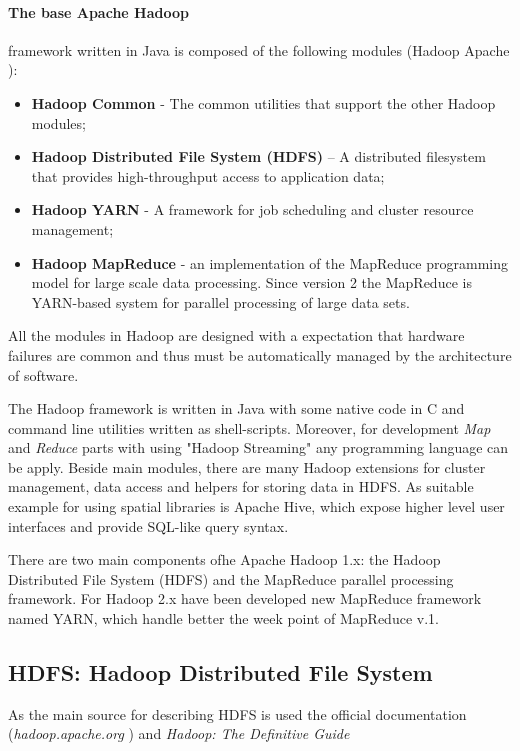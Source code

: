 \documentclass[a4paper,12pt,oneside]{report}
\begin{document}
	\paragraph*{The base Apache Hadoop}framework written in Java is composed of the
	following modules (Hadoop Apache \cite{hadoop_web}):
	\begin{itemize}
		\item \textbf{Hadoop Common} - The common utilities that support the other
		Hadoop modules;
		\item \textbf{Hadoop Distributed File System (HDFS)} – A distributed filesystem
		that provides
		high-throughput access to application data;
		\item \textbf{Hadoop YARN} - A framework for job scheduling and cluster resource
		management;
		\item \textbf{Hadoop MapReduce} - an implementation of the MapReduce programming
		model 
		for large scale data processing. Since version 2 the MapReduce is YARN-based system
		 for parallel processing of large data sets.
	\end{itemize}
	All the modules in Hadoop are designed with a expectation that hardware failures
	are common and thus 
	must be automatically managed by the architecture of  software.
	
	The Hadoop framework is written in Java with some native code in C and command
	line utilities written 
	as shell-scripts. Moreover, for development \textit{Map} and \textit{Reduce}
	parts  
	with using "Hadoop Streaming" any programming language can be apply. 
	Beside main modules, there are many Hadoop extensions for cluster management,
	data access and helpers for storing data in HDFS. As suitable example for using spatial libraries is Apache Hive, 
	which expose higher level user interfaces and provide SQL-like query syntax. 
	
	There are two main components ofhe Apache Hadoop 1.x: the Hadoop
	Distributed File System 
	(HDFS) and the MapReduce parallel processing framework. For Hadoop 2.x have been
	developed new MapReduce 
	framework named YARN, which handle better the week point of MapReduce v.1.
	
	
	\subsection{HDFS: Hadoop Distributed File System}\label{subsec:hdfs}
	As the main source for describing HDFS is used the official documentation
	(\textit{hadoop.apache.org} 
	\cite{hadoop_web}) and  \textit{Hadoop: The Definitive
		Guide}\cite{hadoop_definitive}
	
\end{document}
